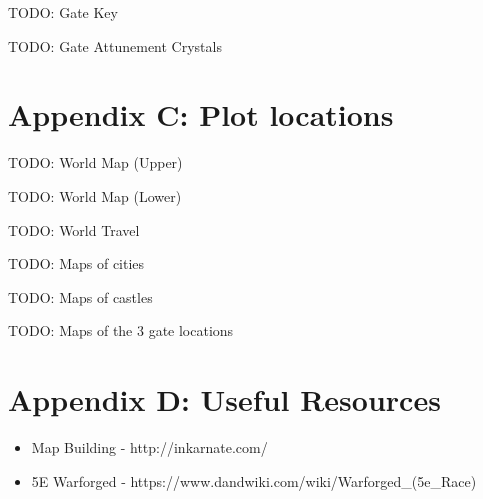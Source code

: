\documentclass[10pt,twoside,twocolumn]{article}
\begin{document}
TODO: Gate Key

TODO: Gate Attunement Crystals

\section{Appendix C: Plot locations}

TODO: World Map (Upper)

TODO: World Map (Lower)

TODO: World Travel

TODO: Maps of cities

TODO: Maps of castles

TODO: Maps of the 3 gate locations

\section{Appendix D: Useful Resources}

\begin{itemize}
\item Map Building - http://inkarnate.com/
\item 5E Warforged - https://www.dandwiki.com/wiki/Warforged_(5e_Race)
\end{itemize}

\end{document}
